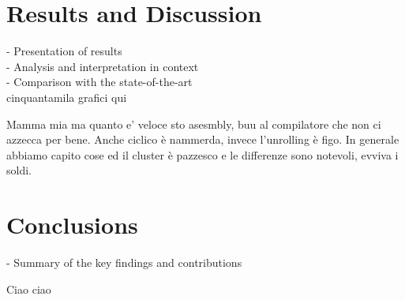 \documentclass[conference]{IEEEtran}
\begin{document}
\section{Results and Discussion}

- Presentation of results \\
- Analysis and interpretation in context \\
- Comparison with the state-of-the-art \\

cinquantamila grafici qui

Mamma mia ma quanto e' veloce sto asesmbly,
buu al compilatore che non ci azzecca per bene. 
Anche ciclico è nammerda, invece l'unrolling
è figo.
In generale abbiamo capito
cose ed il cluster è pazzesco e le differenze
sono notevoli, evviva i soldi.


\section{Conclusions}

- Summary of the key findings and contributions

Ciao ciao
\end{document}
